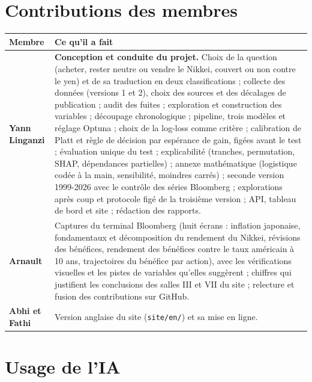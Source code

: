 
\section*{Contributions des membres}

\begin{table}[H]\centering\small
\begin{tabular}{p{3.2cm}p{12cm}}\toprule
Membre & Ce qu'il a fait \\\midrule
\textbf{Yann Linganzi} &
\textbf{Conception et conduite du projet.} Choix de la question (acheter, rester neutre ou vendre le Nikkei, couvert
ou non contre le yen) et de sa traduction en deux classifications ; collecte des données (versions 1 et 2), choix des
sources et des décalages de publication ; audit des fuites ; exploration et construction des variables ; découpage
chronologique ; pipeline, trois modèles et réglage Optuna ; choix de la log-loss comme critère ; calibration de Platt
et règle de décision par espérance de gain, figées avant le test ; évaluation unique du test ; explicabilité
(tranches, permutation, SHAP, dépendances partielles) ; annexe mathématique (logistique codée à la main, sensibilité,
moindres carrés) ; seconde version 1999-2026 avec le contrôle des séries Bloomberg ; explorations après coup et
protocole figé de la troisième version ; API, tableau de bord et site ; rédaction des rapports. \\[3pt]
\textbf{Arnault} &
Captures du terminal Bloomberg (huit écrans : inflation japonaise, fondamentaux et décomposition du rendement du
Nikkei, révisions des bénéfices, rendement des bénéfices contre le taux américain à 10 ans, trajectoires du bénéfice
par action), avec les vérifications visuelles et les pistes de variables qu'elles suggèrent ; chiffres qui justifient
les conclusions des salles III et VII du site ; relecture et fusion des contributions sur GitHub. \\[3pt]
\textbf{Abhi et Fathi} &
Version anglaise du site (\texttt{site/en/}) et sa mise en ligne. \\\bottomrule
\end{tabular}\end{table}

\section*{Usage de l'IA}

